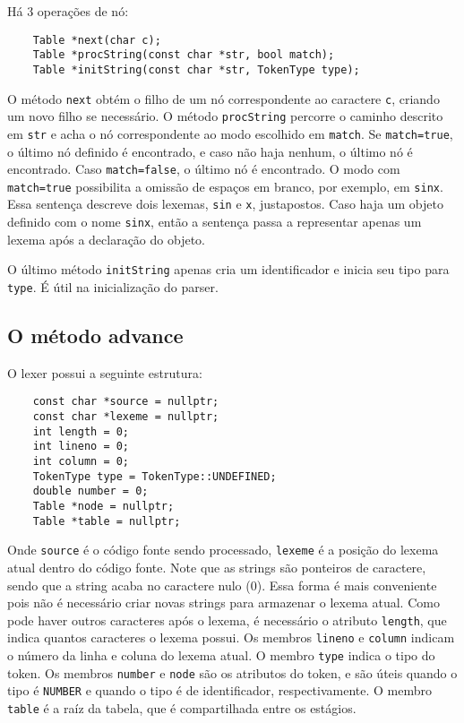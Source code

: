 \documentclass[10pt,a4paper]{article}
\begin{document}
Há 3 operações de nó:
\begin{verbatim}
	Table *next(char c);
	Table *procString(const char *str, bool match);
	Table *initString(const char *str, TokenType type);
\end{verbatim}

O método \texttt{next} obtém o filho de um nó correspondente ao caractere \texttt{c}, criando um novo filho se necessário.
O método \texttt{procString} percorre o caminho descrito em \texttt{str}
 e acha o nó correspondente ao modo escolhido em \texttt{match}.
Se \texttt{match=true}, o último nó definido é encontrado, e caso não haja nenhum, o último nó é encontrado.
Caso \texttt{match=false}, o último nó é encontrado.
O modo com \texttt{match=true} possibilita a omissão de espaços em branco, por exemplo, em \texttt{sinx}.
Essa sentença descreve dois lexemas, \texttt{sin} e \texttt{x}, justapostos.
Caso haja um objeto definido com o nome \texttt{sinx}, então a sentença passa a representar
apenas um lexema após a declaração do objeto.

O último método \texttt{initString} apenas cria um identificador e inicia seu tipo para \texttt{type}.
É útil na inicialização do parser.

\subsection{O método advance}
O lexer possui a seguinte estrutura:
\begin{verbatim}
	const char *source = nullptr;
	const char *lexeme = nullptr;
	int length = 0;
	int lineno = 0;
	int column = 0;
	TokenType type = TokenType::UNDEFINED;
	double number = 0;
	Table *node = nullptr;
	Table *table = nullptr;
\end{verbatim}
Onde \texttt{source} é o código fonte sendo processado,
\texttt{lexeme} é a posição do lexema atual dentro do código fonte.
Note que as strings são ponteiros de caractere, sendo que a string acaba no caractere nulo (0).
Essa forma é mais conveniente pois não é necessário criar novas strings para armazenar o lexema atual.
Como pode haver outros caracteres após o lexema, é necessário o atributo \texttt{length},
que indica quantos caracteres o lexema possui.
Os membros \texttt{lineno} e \texttt{column} indicam o número da linha e coluna do lexema atual.
O membro \texttt{type} indica o tipo do token.
Os membros \texttt{number} e \texttt{node} são os atributos do token,
e são úteis quando o tipo é \texttt{NUMBER} e quando o tipo é de identificador, respectivamente.
O membro \texttt{table} é a raíz da tabela, que é compartilhada entre os estágios.
\end{document}
